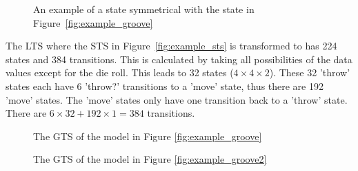 \begin{figure}[ht]
  \begin{center}
    
  \end{center}
  \caption{An example of a state symmetrical with the state in Figure~\ref{fig:example_groove}}
  \label{fig:symmetry_example}
\end{figure}

The LTS where the STS in Figure~\ref{fig:example_sts} is transformed to has 224 states and 384 transitions. This is calculated by taking all possibilities of the data values except for the die roll. This leads to 32 states ($4 \times 4 \times 2$). These 32 'throw' states each have 6 'throw?' transitions to a 'move' state, thus there are 192 'move' states. The 'move' states only have one transition back to a 'throw' state. There are $6 \times 32 + 192 \times 1 = 384$ transitions.

\begin{figure}[ht]
  \begin{center}
    \resizebox{\textwidth}{!}{}
  \end{center}
  \caption{The GTS of the model in Figure \ref{fig:example_groove}}
  \label{fig:statespace_groove1}
\end{figure}

\begin{figure}[ht]
  \begin{center}
    \resizebox{\textwidth}{!}{}
  \end{center}
  \caption{The GTS of the model in Figure \ref{fig:example_groove2}}
  \label{fig:statespace_groove2}
\end{figure}
